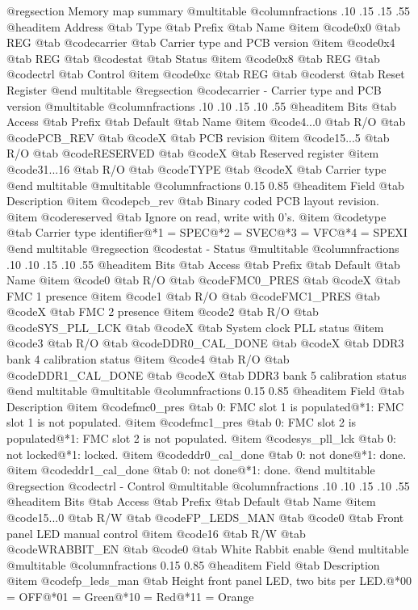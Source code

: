@regsection Memory map summary
@multitable  @columnfractions .10 .15 .15 .55
@headitem Address @tab Type @tab Prefix @tab Name
@item @code{0x0} @tab
REG @tab
@code{carrier} @tab
Carrier type and PCB version
@item @code{0x4} @tab
REG @tab
@code{stat} @tab
Status
@item @code{0x8} @tab
REG @tab
@code{ctrl} @tab
Control
@item @code{0xc} @tab
REG @tab
@code{rst} @tab
Reset Register
@end multitable 
@regsection @code{carrier} - Carrier type and PCB version
@multitable @columnfractions .10 .10 .15 .10 .55
@headitem Bits @tab Access @tab Prefix @tab Default @tab Name
@item @code{4...0}
@tab R/O @tab
@code{PCB_REV}
@tab @code{X} @tab 
PCB revision
@item @code{15...5}
@tab R/O @tab
@code{RESERVED}
@tab @code{X} @tab 
Reserved register
@item @code{31...16}
@tab R/O @tab
@code{TYPE}
@tab @code{X} @tab 
Carrier type
@end multitable
@multitable @columnfractions 0.15 0.85
@headitem Field @tab Description
@item @code{pcb_rev} @tab Binary coded PCB layout revision.
@item @code{reserved} @tab Ignore on read, write with 0's.
@item @code{type} @tab Carrier type identifier@*1 = SPEC@*2 = SVEC@*3 = VFC@*4 = SPEXI
@end multitable
@regsection @code{stat} - Status
@multitable @columnfractions .10 .10 .15 .10 .55
@headitem Bits @tab Access @tab Prefix @tab Default @tab Name
@item @code{0}
@tab R/O @tab
@code{FMC0_PRES}
@tab @code{X} @tab 
FMC 1 presence
@item @code{1}
@tab R/O @tab
@code{FMC1_PRES}
@tab @code{X} @tab 
FMC 2 presence
@item @code{2}
@tab R/O @tab
@code{SYS_PLL_LCK}
@tab @code{X} @tab 
System clock PLL status
@item @code{3}
@tab R/O @tab
@code{DDR0_CAL_DONE}
@tab @code{X} @tab 
DDR3 bank 4 calibration status
@item @code{4}
@tab R/O @tab
@code{DDR1_CAL_DONE}
@tab @code{X} @tab 
DDR3 bank 5 calibration status
@end multitable
@multitable @columnfractions 0.15 0.85
@headitem Field @tab Description
@item @code{fmc0_pres} @tab 0: FMC slot 1 is populated@*1: FMC slot 1 is not populated.
@item @code{fmc1_pres} @tab 0: FMC slot 2 is populated@*1: FMC slot 2 is not populated.
@item @code{sys_pll_lck} @tab 0: not locked@*1: locked.
@item @code{ddr0_cal_done} @tab 0: not done@*1: done.
@item @code{ddr1_cal_done} @tab 0: not done@*1: done.
@end multitable
@regsection @code{ctrl} - Control
@multitable @columnfractions .10 .10 .15 .10 .55
@headitem Bits @tab Access @tab Prefix @tab Default @tab Name
@item @code{15...0}
@tab R/W @tab
@code{FP_LEDS_MAN}
@tab @code{0} @tab 
Front panel LED manual control
@item @code{16}
@tab R/W @tab
@code{WRABBIT_EN}
@tab @code{0} @tab 
White Rabbit enable
@end multitable
@multitable @columnfractions 0.15 0.85
@headitem Field @tab Description
@item @code{fp_leds_man} @tab Height front panel LED, two bits per LED.@*00 = OFF@*01 = Green@*10 = Red@*11 = Orange
